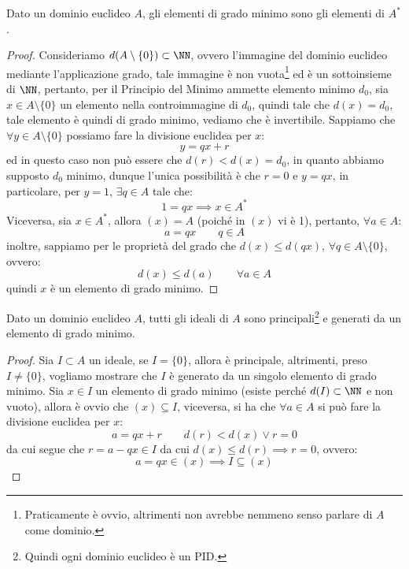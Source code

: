 \documentclass[11pt]{scrartcl}
\begin{document}
\begin{proposition}
    Dato un dominio euclideo $A$, gli elementi di grado minimo sono gli elementi di $A^*$.
\end{proposition}

\begin{proof}
    Consideriamo $d(A\setminus\{0\}) \subset \NN$, ovvero l'immagine del dominio euclideo mediante l'applicazione grado, tale immagine è non vuota\footnote{Praticamente è ovvio, altrimenti non avrebbe nemmeno senso
    parlare di $A$ come dominio.} ed è un sottoinsieme di $\NN$, pertanto, per il Principio del Minimo ammette elemento minimo $d_0$, sia $x \in A\setminus\{0\}$ un elemento nella controimmagine di $d_0$, quindi
    tale che $d(x) = d_0$, tale elemento è quindi di grado minimo, vediamo che è invertibile. Sappiamo che $\forall y \in A\setminus\{0\}$ possiamo fare la divisione euclidea per $x$:
    \[ y = qx + r
        \]
    ed in questo caso non può essere che $d(r) < d(x) = d_0$, in quanto abbiamo supposto $d_0$ minimo, dunque l'unica possibilità è che $r = 0$ e $y = qx$, in particolare, per $y = 1$, $\exists q \in A$ tale che:
    \[ 1 = qx \implies x \in A^*
        \]
    Viceversa, sia $x \in A^*$, allora $(x) = A$ (poiché in $(x)$ vi è 1), pertanto, $\forall a \in A$:
    \[ a = qx \qquad q \in A
        \]
    inoltre, sappiamo per le proprietà del grado che $d(x) \leq d(qx)$, $\forall q \in A\setminus\{0\}$, ovvero:
    \[ d(x) \leq d(a) \qquad \forall a \in A
        \]
    quindi $x$ è un elemento di grado minimo.
\end{proof}

\begin{proposition}
    \label{2.93}
    Dato un dominio euclideo $A$, tutti gli ideali di $A$ sono principali\footnote{Quindi ogni dominio euclideo è un PID.} e generati da un elemento di grado minimo.
\end{proposition}

\begin{proof}
    Sia $I \subset A$ un ideale, se $I = \{0\}$, allora è principale, altrimenti, preso $I \ne \{0\}$, vogliamo mostrare che $I$ è generato da un singolo elemento di grado minimo.
    Sia $x \in I$ un elemento di grado minimo (esiste perché $d(I) \subset \NN$ e non vuoto), allora è ovvio che $(x) \subseteq I$, viceversa, si ha che $\forall a \in A$ si può fare la divisione euclidea per $x$:
    \[ a = qx + r \qquad d(r) < d(x) \vee r = 0
        \]
    da cui segue che $r = a - qx \in I$ da cui $d(x) \leq d(r) \implies r = 0$, ovvero:
    \[ a = qx \in (x) \implies I \subseteq (x)
        \]
\end{proof}
\end{document}
